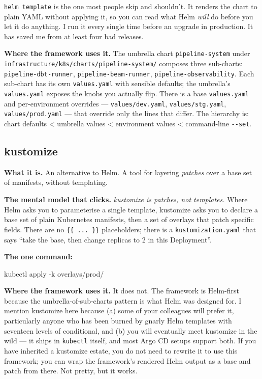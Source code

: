 \documentclass[
  11pt,
  british,
  oneside]{book}
\newenvironment{Shaded}{\begin{snugshade}}{\end{snugshade}}
\newcommand{\ExtensionTok}[1]{#1}
\newcommand{\NormalTok}[1]{#1}
\begin{document}
\texttt{helm\ template} is the one most people skip and shouldn't. It
renders the chart to plain YAML without applying it, so you can read
what Helm \emph{will} do before you let it do anything. I run it every
single time before an upgrade in production. It has saved me from at
least four bad releases.

\textbf{Where the framework uses it.} The umbrella chart
\texttt{pipeline-system} under
\texttt{infrastructure/k8s/charts/pipeline-system/} composes three
sub-charts: \texttt{pipeline-dbt-runner}, \texttt{pipeline-beam-runner},
\texttt{pipeline-observability}. Each sub-chart has its own
\texttt{values.yaml} with sensible defaults; the umbrella's
\texttt{values.yaml} exposes the knobs you actually flip. There is a
base \texttt{values.yaml} and per-environment overrides ---
\texttt{values/dev.yaml}, \texttt{values/stg.yaml},
\texttt{values/prod.yaml} --- that override only the lines that differ.
The hierarchy is: chart defaults \textless{} umbrella values \textless{}
environment values \textless{} command-line \texttt{-\/-set}.

\hypertarget{kustomize}{%
\subsection{kustomize}\label{kustomize}}

\textbf{What it is.} An alternative to Helm. A tool for layering
\emph{patches} over a base set of manifests, without templating.

\textbf{The mental model that clicks.} \emph{kustomize is patches, not
templates.} Where Helm asks you to parameterise a single template,
kustomize asks you to declare a base set of plain Kubernetes manifests,
then a set of overlays that patch specific fields. There are no
\texttt{\{\{\ ...\ \}\}} placeholders; there is a
\texttt{kustomization.yaml} that says ``take the base, then change
replicas to 2 in this Deployment''.

\textbf{The one command:}

\begin{Shaded}
\begin{Highlighting}[]
\ExtensionTok{kubectl}\NormalTok{ apply {-}k overlays/prod/}
\end{Highlighting}
\end{Shaded}

\textbf{Where the framework uses it.} It does not. The framework is
Helm-first because the umbrella-of-sub-charts pattern is what Helm was
designed for. I mention kustomize here because (a) some of your
colleagues will prefer it, particularly anyone who has been burned by
gnarly Helm templates with seventeen levels of conditional, and (b) you
will eventually meet kustomize in the wild --- it ships in
\texttt{kubectl} itself, and most Argo CD setups support both. If you
have inherited a kustomize estate, you do not need to rewrite it to use
this framework; you can wrap the framework's rendered Helm output as a
base and patch from there. Not pretty, but it works.
\end{document}
